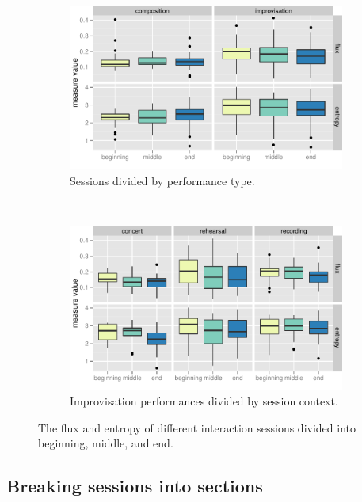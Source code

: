 \documentclass{sigchi}
\begin{document}
\begin{figure}[t!]
    \centering
    \begin{subfigure}[t]{0.5\linewidth}
        \centering
          \includegraphics[width=\linewidth]{figures/type-section-flux-entropy}
          \caption{Sessions divided by performance type. \label{fig:type-section-flux-entropy}}
    \end{subfigure}%
    ~ 
    \begin{subfigure}[t]{0.5\linewidth}
        \centering
          \includegraphics[width=\linewidth]{figures/context-section-flux-entropy}
          \caption{Improvisation performances divided by session context. \label{fig:context-section-flux-entropy}}
    \end{subfigure}
    \caption{The flux and entropy of different interaction sessions
      divided into beginning, middle, and end.}
\end{figure}


\subsection{Breaking sessions into sections}
\end{document}
